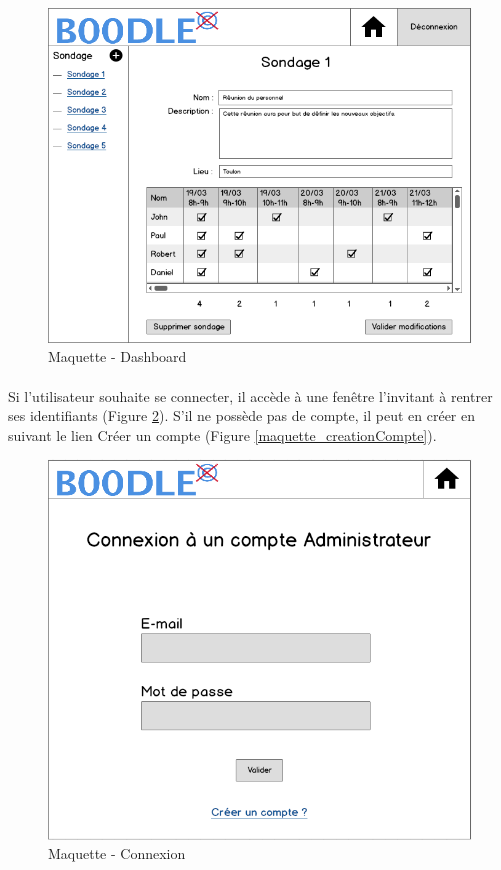 \documentclass[]{report}
\begin{document}
\begin{figure}[h]
	\caption{Maquette - Dashboard}
	\label{maquette_dashboard}
	\centering
	\includegraphics[scale=0.7]{figures/maquettes/dashboard.png}
\end{figure}

\paragraph{} Si l'utilisateur souhaite se connecter, il accède à une fenêtre l'invitant à rentrer ses identifiants (Figure \ref{maquette_connexion}). S'il ne possède pas de compte, il peut en créer en suivant le lien Créer un compte (Figure \ref{maquette_creationCompte}).

\begin{figure}[h]
	\caption{Maquette - Connexion}
	\label{maquette_connexion}
	\centering
	\includegraphics[scale=0.7]{figures/maquettes/connexion.png}
\end{figure}
\end{document}
